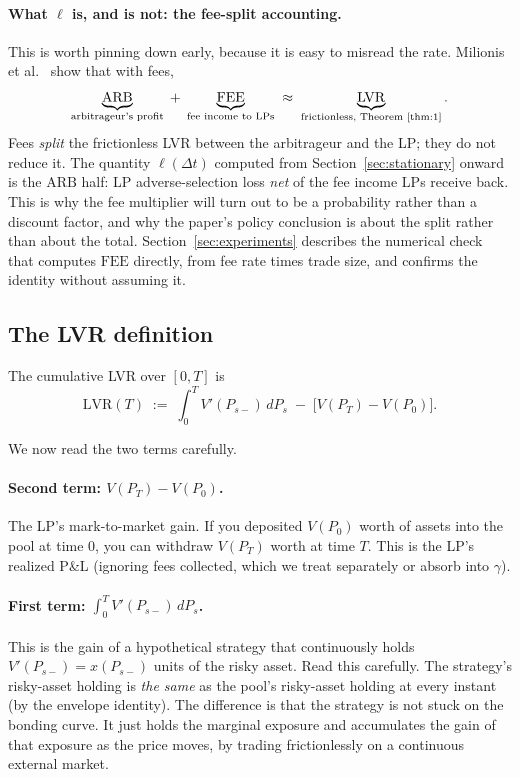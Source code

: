 \documentclass[11pt]{article}
\theoremstyle{definition}
\theoremstyle{remark}
\newcommand{\dt}{\Delta t}
\newcommand{\1}{\mathbf{1}}
\begin{document}
\paragraph{What $\ell$ is, and is not: the fee-split accounting.}
This is worth pinning down early, because it is easy to misread the rate. Milionis et al.~\cite[Thms.~3--4]{milionis2023automated} show that with fees,
\[
\underbrace{\mathrm{ARB}}_{\text{arbitrageur's profit}} \;+\; \underbrace{\mathrm{FEE}}_{\text{fee income to LPs}} \;\approx\; \underbrace{\mathrm{LVR}}_{\text{frictionless, Theorem~\ref{thm:1}}}.
\]
Fees \emph{split} the frictionless LVR between the arbitrageur and the LP; they do not reduce it. The quantity $\ell(\dt)$ computed from Section~\ref{sec:stationary} onward is the $\mathrm{ARB}$ half: LP adverse-selection loss \emph{net} of the fee income LPs receive back. This is why the fee multiplier will turn out to be a probability rather than a discount factor, and why the paper's policy conclusion is about the split rather than about the total. Section~\ref{sec:experiments} describes the numerical check that computes $\mathrm{FEE}$ directly, from fee rate times trade size, and confirms the identity without assuming it.

\subsection{The LVR definition}

The cumulative LVR over $[0, T]$ is
\begin{equation}\label{eq:lvr}
\mathrm{LVR}(T) \;:=\; \int_0^T V'(P_{s-})\,dP_s \;-\; \big[V(P_T) - V(P_0)\big].
\end{equation}

We now read the two terms carefully.

\paragraph{Second term: $V(P_T) - V(P_0)$.}
The LP's mark-to-market gain. If you deposited $V(P_0)$ worth of assets into the pool at time $0$, you can withdraw $V(P_T)$ worth at time $T$. This is the LP's realized P\&L (ignoring fees collected, which we treat separately or absorb into $\gamma$).

\paragraph{First term: $\int_0^T V'(P_{s-})\,dP_s$.}
This is the gain of a hypothetical strategy that continuously holds $V'(P_{s-}) = x(P_{s-})$ units of the risky asset. Read this carefully. The strategy's risky-asset holding is \emph{the same} as the pool's risky-asset holding at every instant (by the envelope identity). The difference is that the strategy is not stuck on the bonding curve. It just holds the marginal exposure and accumulates the gain of that exposure as the price moves, by trading frictionlessly on a continuous external market.
\end{document}
